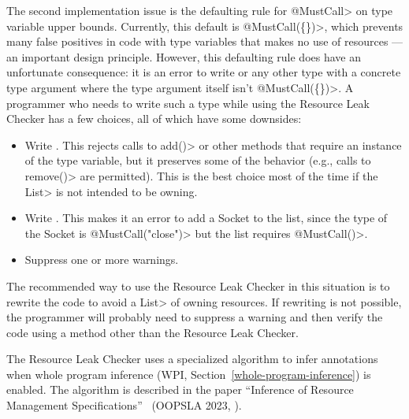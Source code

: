 The second implementation issue is the defaulting rule for \<@MustCall> on
type variable upper bounds.  Currently, this default is \<@MustCall(\{\})>,
which prevents many false positives in code with type variables that makes
no use of resources --- an important design principle.
However, this defaulting rule does have an unfortunate consequence: it is
an error to write  or any other type with a concrete
type argument where the type argument itself isn't \<@MustCall(\{\})>. A programmer who
needs to write such a type while using the Resource Leak Checker has a few
choices, all of which have some downsides:

\begin{itemize}
\item Write . This rejects calls to \<add()>
or other methods that require an instance of the type variable, but it
preserves some of the behavior (e.g., calls to \<remove()> are permitted).
This is the best choice most of the time if the \<List> is not intended to
be owning.
\item Write . This makes it an error to
add a Socket to the list, since the type of the Socket is
\<@MustCall("close")> but the list requires \<@MustCall()>.
\item Suppress one or more warnings.
\end{itemize}

The recommended way to use the Resource Leak Checker in this situation is
to rewrite the code to avoid a \<List> of owning resources. If rewriting is
not possible, the programmer will probably need to suppress a warning and
then verify the code using a method other than the Resource Leak Checker.



The Resource Leak Checker uses a specialized algorithm to infer annotations
when whole program inference (WPI, Section~\ref{whole-program-inference})
is enabled.  The algorithm is described in the paper ``Inference of
Resource Management Specifications''~\cite{ShadabGTEKLLS2023} (OOPSLA 2023,
).


